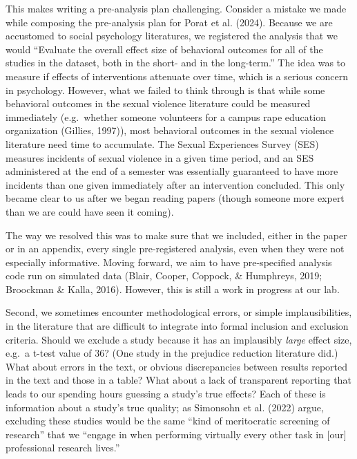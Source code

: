 \documentclass[
  man]{apa6}
\begin{document}
This makes writing a pre-analysis plan challenging. Consider a mistake we made while composing the pre-analysis plan for Porat et al. (2024). Because we are accustomed to social psychology literatures, we registered the analysis that we would ``Evaluate the overall effect size of behavioral outcomes for all of the studies in the dataset, both in the short- and in the long-term.'' The idea was to measure if effects of interventions attenuate over time, which is a serious concern in psychology. However, what we failed to think through is that while some behavioral outcomes in the sexual violence literature could be measured immediately (e.g.~whether someone volunteers for a campus rape education organization (Gillies, 1997)), most behavioral outcomes in the sexual violence literature need time to accumulate. The Sexual Experiences Survey (SES) measures incidents of sexual violence in a given time period, and an SES administered at the end of a semester was essentially guaranteed to have more incidents than one given immediately after an intervention concluded. This only became clear to us after we began reading papers (though someone more expert than we are could have seen it coming).

The way we resolved this was to make sure that we included, either in the paper or in an appendix, every single pre-registered analysis, even when they were not especially informative. Moving forward, we aim to have pre-specified analysis code run on simulated data (Blair, Cooper, Coppock, \& Humphreys, 2019; Broockman \& Kalla, 2016). However, this is still a work in progress at our lab.

Second, we sometimes encounter methodological errors, or simple implausibilities, in the literature that are difficult to integrate into formal inclusion and exclusion criteria. Should we exclude a study because it has an implausibly \emph{large} effect size, e.g.~a t-test value of 36? (One study in the prejudice reduction literature did.) What about errors in the text, or obvious discrepancies between results reported in the text and those in a table? What about a lack of transparent reporting that leads to our spending hours guessing a study's true effects? Each of these is information about a study's true quality; as Simonsohn et al. (2022) argue, excluding these studies would be the same ``kind of meritocratic screening of research'' that we ``engage in when performing virtually every other task in {[}our{]} professional research lives.''
\end{document}
